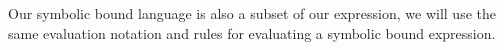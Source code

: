 Our symbolic bound language is also a subset of our expression, we will use the same evaluation notation and rules for evaluating a symbolic bound expression.

  
